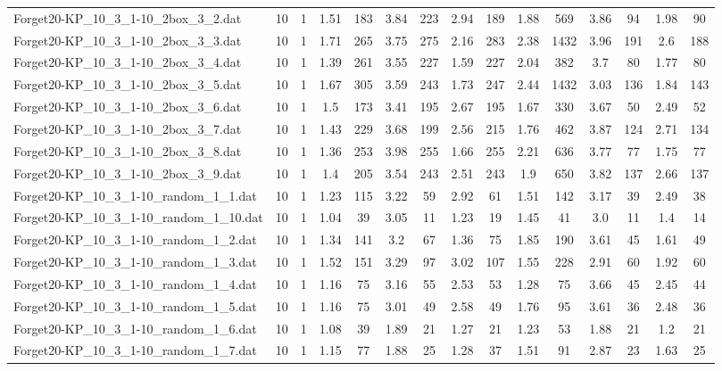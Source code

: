 \begin{table}[!ht]
{\begin{tabular}{lcccccccccccccc}
Forget20-KP\_10\_3\_1-10\_2box\_3\_2.dat & 10 & 1 & 1.51 & 183 & 3.84 & 223 & 2.94 & 189 & 1.88 & 569 & 3.86 & 94 & 1.98 & 90 \\
Forget20-KP\_10\_3\_1-10\_2box\_3\_3.dat & 10 & 1 & 1.71 & 265 & 3.75 & 275 & 2.16 & 283 & 2.38 & 1432 & 3.96 & 191 & 2.6 & 188 \\
Forget20-KP\_10\_3\_1-10\_2box\_3\_4.dat & 10 & 1 & 1.39 & 261 & 3.55 & 227 & 1.59 & 227 & 2.04 & 382 & 3.7 & 80 & 1.77 & 80 \\
Forget20-KP\_10\_3\_1-10\_2box\_3\_5.dat & 10 & 1 & 1.67 & 305 & 3.59 & 243 & 1.73 & 247 & 2.44 & 1432 & 3.03 & 136 & 1.84 & 143 \\
Forget20-KP\_10\_3\_1-10\_2box\_3\_6.dat & 10 & 1 & 1.5 & 173 & 3.41 & 195 & 2.67 & 195 & 1.67 & 330 & 3.67 & 50 & 2.49 & 52 \\
Forget20-KP\_10\_3\_1-10\_2box\_3\_7.dat & 10 & 1 & 1.43 & 229 & 3.68 & 199 & 2.56 & 215 & 1.76 & 462 & 3.87 & 124 & 2.71 & 134 \\
Forget20-KP\_10\_3\_1-10\_2box\_3\_8.dat & 10 & 1 & 1.36 & 253 & 3.98 & 255 & 1.66 & 255 & 2.21 & 636 & 3.77 & 77 & 1.75 & 77 \\
Forget20-KP\_10\_3\_1-10\_2box\_3\_9.dat & 10 & 1 & 1.4 & 205 & 3.54 & 243 & 2.51 & 243 & 1.9 & 650 & 3.82 & 137 & 2.66 & 137 \\
Forget20-KP\_10\_3\_1-10\_random\_1\_1.dat & 10 & 1 & 1.23 & 115 & 3.22 & 59 & 2.92 & 61 & 1.51 & 142 & 3.17 & 39 & 2.49 & 38 \\
Forget20-KP\_10\_3\_1-10\_random\_1\_10.dat & 10 & 1 & 1.04 & 39 & 3.05 & 11 & 1.23 & 19 & 1.45 & 41 & 3.0 & 11 & 1.4 & 14 \\
Forget20-KP\_10\_3\_1-10\_random\_1\_2.dat & 10 & 1 & 1.34 & 141 & 3.2 & 67 & 1.36 & 75 & 1.85 & 190 & 3.61 & 45 & 1.61 & 49 \\
Forget20-KP\_10\_3\_1-10\_random\_1\_3.dat & 10 & 1 & 1.52 & 151 & 3.29 & 97 & 3.02 & 107 & 1.55 & 228 & 2.91 & 60 & 1.92 & 60 \\
Forget20-KP\_10\_3\_1-10\_random\_1\_4.dat & 10 & 1 & 1.16 & 75 & 3.16 & 55 & 2.53 & 53 & 1.28 & 75 & 3.66 & 45 & 2.45 & 44 \\
Forget20-KP\_10\_3\_1-10\_random\_1\_5.dat & 10 & 1 & 1.16 & 75 & 3.01 & 49 & 2.58 & 49 & 1.76 & 95 & 3.61 & 36 & 2.48 & 36 \\
Forget20-KP\_10\_3\_1-10\_random\_1\_6.dat & 10 & 1 & 1.08 & 39 & 1.89 & 21 & 1.27 & 21 & 1.23 & 53 & 1.88 & 21 & 1.2 & 21 \\
Forget20-KP\_10\_3\_1-10\_random\_1\_7.dat & 10 & 1 & 1.15 & 77 & 1.88 & 25 & 1.28 & 37 & 1.51 & 91 & 2.87 & 23 & 1.63 & 25 \\

\end{tabular}}
\end{table}

